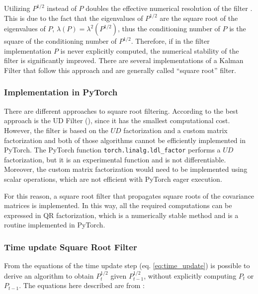 \documentclass{article}
\begin{document}
Utilizing $P^{1/2}$ instead of $P$ doubles the effective numerical resolution of the filter \cite{kaminski_discrete_1971,dan_simon_optimal_2006,rutten_square-root_2013}. This is due to the fact that the eigenvalues of $P^{1/2}$ are the square root of the eigenvalues of $P$, $\lambda(P) = \lambda^2(P^{1/2})$, thus the conditioning number of $P$ is the square of the conditioning number of $P^{1/2}$. Therefore, if in the filter implementation $P$ is never explicitly computed, the numerical stability of the filter is significantly improved.
There are several implementations of a Kalman Filter that follow this approach \cite{potter_statistical_1963,carlson_fast_1973,bierman_numerical_1977} and are generally called ``square root'' filter.

\subsubsection{Implementation in PyTorch}

There are different approaches to square root filtering. According to \cite{mohinder_s_grewal_kalman_2001} the best approach is the UD Filter (\cite{bierman_numerical_1977}), since it has the smallest computational cost. However, the filter is based on the $UD$ factorization and a custom matrix factorization \cite{mohinder_s_grewal_kalman_2001} and both of those algorithms cannot be efficiently implemented in PyTorch. The PyTorch function \verb|torch.linalg.ldl_factor| performs a $UD$ factorization, but it is an experimental function and is not differentiable. Moreover, the custom matrix factorization would need to be implemented using scalar operations, which are not efficient with PyTorch eager execution.

For this reason, a square root filter that propagates square roots of the covariance matrices is implemented. In this way, all the required computations can be expressed in QR factorization, which is a numerically stable method and is a routine implemented in PyTorch.

\subsubsection{Time update Square Root Filter}

From the equations of the time update step (eq. \ref{eq:time_update}) is possible to derive an algorithm to obtain $P_t^{1/2}$ given $P_{t-1}^{1/2}$, without explicitly computing $P_t$ or $P_{t-1}$. The equations here described are from \textcite[eq. 6.60]{mohinder_s_grewal_kalman_2001}:
\end{document}
